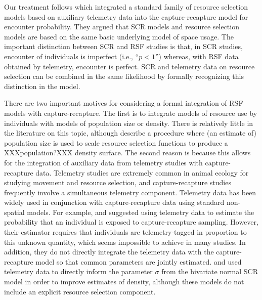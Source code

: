 Our treatment follows
\citet{royle_etal:2012mee} which integrated a standard family of
resource selection models based on auxiliary telemetry data into the
capture-recapture model for encounter probability.
They  argued that SCR models and resource
selection models \citep{manly_etal:2002} are based on the same basic
underlying model of space usage. The important distinction between SCR
and RSF studies is that, in SCR studies, encounter of individuals is
imperfect (i.e., ``$p<1$'') whereas, with RSF data obtained by
telemetry, encounter is perfect. 
SCR and telemetry data on resource selection can be combined in the
same likelihood by formally recognizing this distinction in the model.  

There are two important motives for considering a formal integration
of RSF models with capture-recapture. The first is to integrate models
of resource use by individuals with models of population size or
density. There is relatively little in the literature on this topic,
although \citet{boyce_mcdonald:1999} describe a procedure where (an
estimate of) population size is used to scale resource selection
functions to produce a XXXpopulation?XXX density surface. The second reason is because
this allows for the integration of auxiliary data from telemetry
studies with capture-recapture data.  Telemetry studies are extremely
common in animal ecology for studying movement and resource selection,
and capture-recapture studies frequently involve a simultaneous
telemetry component.  Telemetry data has been widely used in
conjunction with capture-recapture data using standard non-spatial
models.  For example, \citet{white_shenk:2001} and \citet{ivan:2012}
suggested using telemetry data to estimate the probability that an
individual is exposed to capture-recapture sampling. However, their estimator requires
that individuals are telemetry-tagged in proportion to this unknown quantity,
which seems impossible to achieve in many studies. In addition, they
do not directly integrate the telemetry data with the
capture-recapture model so that common parameters are jointly
estimated.  \citet{sollmann_etal:inprepjapplecol} and
\citet{sollmann_etal:2012ecol} used telemetry data to directly inform
the parameter $\sigma$ from the bivariate normal SCR model in order to
improve estimates of density, although these models do not include an
explicit resource selection component.


